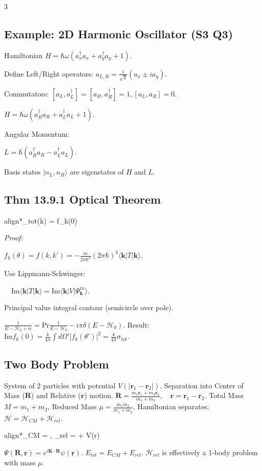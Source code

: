 \documentclass[10pt,a4paper]{article}
\newcommand{\important}[1]{\begin{empheq}[box=\fbox]{align*}#1\end{empheq}}
\begin{document}
\begin{multicols*}{3}
\subsection*{Example: 2D Harmonic Oscillator (S3 Q3)}

Hamiltonian $H = \hbar\omega(a_x^\dagger a_x + a_y^\dagger a_y + 1)$.

Define Left/Right operators: $a_{L,R} = \frac{1}{\sqrt{2}}(a_x \pm i a_y)$.

Commutators: $[a_L, a_L^\dagger] = [a_R, a_R^\dagger] = 1, [a_L, a_R] = 0$.

$H = \hbar\omega(a_R^\dagger a_R + a_L^\dagger a_L + 1)$.

Angular Momentum: 

$L = \hbar(a_R^\dagger a_R - a_L^\dagger a_L)$.

Basis states $|n_L, n_R\rangle$ are eigenstates of $H$ and $L$.
\subsection*{Thm 13.9.1 Optical Theorem}
\important{\sigma_{tot}(k) =   f_k(0)}
\textit{Proof:} 

$f_k(\theta) = f(k,k') = -\frac{m}{2\pi\hbar^2} (2\pi\hbar)^3 \langle \mathbf{k} | T | \mathbf{k} \rangle$.

Use Lippmann-Schwinger: 

$\quad \text{Im}\langle \mathbf{k}|T|\mathbf{k}\rangle = \text{Im}\langle \mathbf{k}|V|\Psi_\mathbf{k}^{in}\rangle$.

Principal value integral contour (semicircle over pole).

$\frac{1}{E - \mathcal{H}_0 + i\epsilon} = \text{Pr}\frac{1}{E-\mathcal{H}_0} - i\pi \delta(E-\mathcal{H}_0)$.
Result: $\text{Im} f_k(0) = \frac{k}{4\pi} \int d\Omega' |f_k(\theta')|^2 = \frac{k}{4\pi} \sigma_{tot}$.






\subsection*{Two Body Problem}
System of 2 particles with potential $V(|\mathbf{r}_1 - \mathbf{r}_2|)$.
Separation into Center of Mass ($\mathbf{R}$) and Relative ($\mathbf{r}$) motion.
$\mathbf{R} = \frac{m_1\mathbf{r}_1+m_2\mathbf{r}_2}{m_1+m_2}, \quad \mathbf{r} = \mathbf{r}_1-\mathbf{r}_2$.
Total Mass $M = m_1+m_2$, Reduced Mass $\mu = \frac{m_1m_2}{m_1+m_2}$.
Hamiltonian separates: $\mathcal{H} = \mathcal{H}_{CM} + _{rel}$.
\important{\mathcal{H}_{CM} = , \quad \mathcal{H}_{rel} = \frac{\mathbf{p}^2}{2\mu} + V(r)}
$\Psi(\mathbf{R}, \mathbf{r}) = e^{i\mathbf{K}\cdot\mathbf{R}} \psi(\mathbf{r})$. $E_{tot} = E_{CM} + E_{rel}$.
$\mathcal{H}_{rel}$ is effectively a 1-body problem with mass $\mu$.


\end{multicols*}
\end{document}
